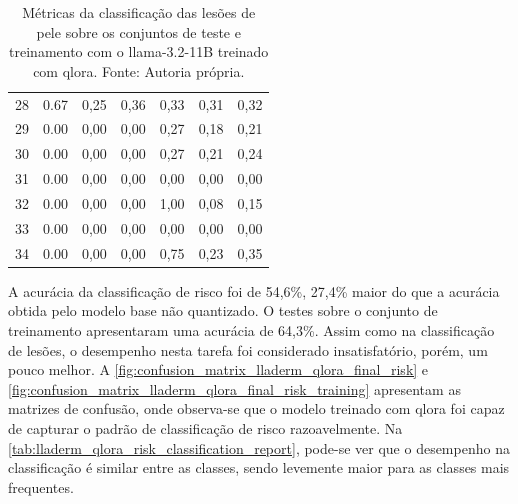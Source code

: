 \begin{table}[ht]
\begin{tabular}{l|c|c|c|c|c|c}
        28    & 0.67                                    & 0,25                                        & 0,36      &
        0,33  & 0,31                                    & 0,32                                                      \\
        29    & 0.00                                    & 0,00                                        & 0,00      &
        0,27  & 0,18                                    & 0,21                                                      \\
        30    & 0.00                                    & 0,00                                        & 0,00      &
        0,27  & 0,21                                    & 0,24                                                      \\
        31    & 0.00                                    & 0,00                                        & 0,00      &
        0,00  & 0,00                                    & 0,00                                                      \\
        32    & 0.00                                    & 0,00                                        & 0,00      &
        1,00  & 0,08                                    & 0,15                                                      \\
        33    & 0.00                                    & 0,00                                        & 0,00      &
        0,00  & 0,00                                    & 0,00                                                      \\
        34    & 0.00                                    & 0,00                                        & 0,00      &
        0,75  & 0,23                                    & 0,35                                                      \\
        \hline
    \end{tabular}
    \label{tab:lladerm_qlora_skin_lesion_classification_report}
    \caption{Métricas da classificação das lesões de pele sobre os conjuntos de teste e treinamento com o
    \ac{llama}-3.2-11B treinado com \ac{qlora}. Fonte: Autoria própria.}
\end{table}

\clearpage

A acurácia da classificação de risco foi de 54,6\%, 27,4\% maior do que a acurácia obtida pelo modelo base não
quantizado. O testes sobre o conjunto de treinamento apresentaram uma acurácia de 64,3\%. Assim como na classificação
de lesões, o desempenho nesta tarefa foi considerado insatisfatório, porém, um pouco melhor. A
\autoref{fig:confusion_matrix_lladerm_qlora_final_risk} e
\autoref{fig:confusion_matrix_lladerm_qlora_final_risk_training} apresentam as matrizes de confusão, onde observa-se
que o modelo treinado com \ac{qlora} foi capaz de capturar o padrão de classificação de risco razoavelmente. Na
\autoref{tab:lladerm_qlora_risk_classification_report}, pode-se ver que o desempenho na classificação é similar entre
as classes, sendo levemente maior para as classes mais frequentes.

